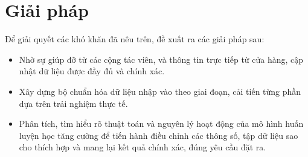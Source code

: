 \section{Giải pháp}
Để giải quyết các khó khăn đã nêu trên, đề xuất ra các giải pháp sau:

\begin{itemize}
    \item Nhờ sự giúp đỡ từ các cộng tác viên, và thông tin trực tiếp
    từ cửa hàng, cập nhật dữ liệu được đầy đủ và chính xác.
    \item Xây dựng bộ chuẩn hóa dữ liệu nhập vào theo giai đoạn,
    cải tiến từng phần dựa trên trải nghiệm thực tế.
    \item Phân tích, tìm hiểu rõ thuật toán và nguyên lý hoạt động
    của mô hình huấn luyện học tăng cường để tiến hành điều chỉnh các
    thông số, tập dữ liệu sao cho thích hợp và mang lại
    kết quả chính xác, đúng yêu cầu đặt ra.
\end{itemize}
